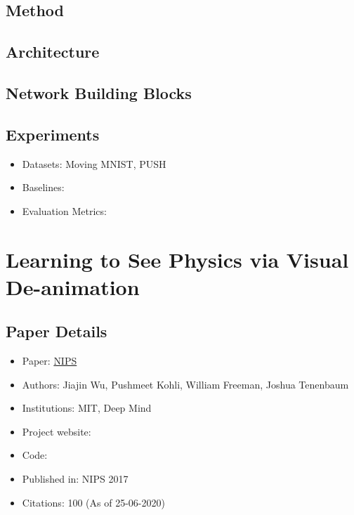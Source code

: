 \documentclass{article}
\begin{document}
    \subsection{Method}\label{subsec:Video_Pixel_Network_(VPN):method}

    \subsection{Architecture}\label{subsec:Video_Pixel_Network_(VPN):architecture}

    \subsection{Network Building Blocks}\label{subsec:Video_Pixel_Network_(VPN):network-building-blocks}
    \subsection*{Experiments}
    \begin{itemize}
        \item Datasets: Moving MNIST, PUSH
        \item Baselines:
        \item Evaluation Metrics:
    \end{itemize}
    \newpage


    \section{Learning to See Physics via Visual De-animation}\label{sec:Learning_to_See_Physics_via_Visual_De_animation}
    \subsection*{Paper Details}
    \begin{itemize}
        \item Paper: \href{http://papers.nips.cc/paper/6620-learning-to-see-physics-via-visual-de-animation}{NIPS}
        \item Authors: Jiajin Wu, Pushmeet Kohli, William Freeman, Joshua Tenenbaum
        \item Institutions: MIT, Deep Mind
        \item Project website:
        \item Code:
        \item Published in: NIPS 2017
        \item Citations: 100 (As of 25-06-2020)
    \end{itemize}
\end{document}
